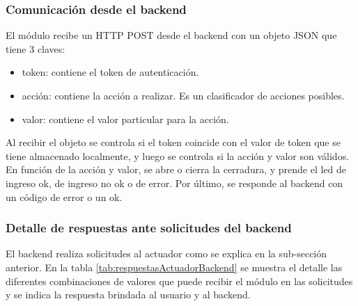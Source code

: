 \subsubsection{Comunicación desde el backend}

El módulo recibe un HTTP POST desde el backend con un objeto JSON que tiene 3 claves:

\begin{itemize}
\item token: contiene el token de autenticación.
\item acción: contiene la acción a realizar. Es un clasificador de acciones posibles.
\item valor: contiene el valor particular para la acción.
\end{itemize}

Al recibir el objeto se controla si el token coincide con el valor de token que se tiene almacenado localmente, y luego se controla si la acción y valor son válidos. En función de la acción y valor, se abre o cierra la cerradura, y prende el led de ingreso ok, de ingreso no ok o de error. Por último, se responde al backend con un código de error o un ok.

\subsubsection{Detalle de respuestas ante solicitudes del backend}

El backend realiza solicitudes al actuador como se explica en la sub-sección anterior. En la tabla \ref{tab:respuestasActuadorBackend} se muestra el detalle las diferentes combinaciones de valores que puede recibir el módulo en las solicitudes y se indica la respuesta brindada al usuario y al backend.


